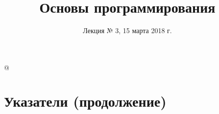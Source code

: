 %





\title{Основы программирования}
\subtitle{Лекция № 3, 15 марта 2018 г.}
\date{}




\lstMakeShortInline[style=inlineC]@

\begin{frame}[plain]
  \titlepage
\end{frame}


\section{Указатели (продолжение)}


\newcommand\memtop{1}
\newcommand\membottom{0}

\newcommand{\memline}[2]{
  \def\left{#1-0.45}
  \def\right{#2+0.45}

  \draw[byte lines] (\left,\membottom) grid (\right,\memtop);

  \foreach \y in {\membottom, \memtop}
    \draw (\left,\y) -- (\right,\y);

  \foreach \x in {\left, \right}
    \draw [decorate,decoration={snake,amplitude=0.3mm,segment length=3mm}]
      (\x,\membottom) -- (\x,\memtop);
}

\newcommand{\memblock}[3]{
  \def\left{#1}
  \def\right{#2}
  \def\blockname{#3}

  \draw [mem block,draw=none] (\left,\membottom) rectangle (\right,\memtop);
  \draw [block byte lines] (\left,\membottom) grid (\right,\memtop);
  \draw [mem block,fill=none] (\left,\membottom) rectangle (\right,\memtop)
    node [pos=0.5] (block \blockname) {};
}

\newcommand{\memaddr}[2]{
  \def\x{#1+0.5}
  \def\y{\membottom-0.5}
  \draw [-latex,shorten <=6pt] (\x,\y)
    node [fill=white,inner sep=0,outer sep=0] {\ttfamily\small #2} -- (\x,\membottom);
}

